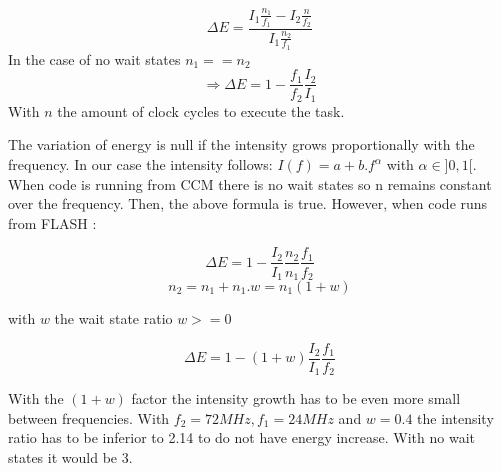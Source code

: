 \documentclass[conference]{IEEEtran}
\begin{document}
\[\Delta E = \frac{I_1 \frac{n_1}{f_1} - I_2 \frac{n}{f_2}}{I_1 \frac{n_2}{f_1}} \]
In the case of no wait states $n_1 == n_2$
\[\Rightarrow \Delta E = 1 - \frac{f_1}{f_2} \frac{I_2}{I_1}\]
With $n$ the amount of clock cycles to execute the task.

The variation of energy is null if the intensity grows proportionally with the
frequency. In our case the intensity follows: $I(f) = a + b.f^\alpha$ with
$\alpha \in ]0,1[$. When code is running from CCM there is no wait states so n
remains constant over the frequency. Then, the above formula is true. However,
when code runs from FLASH :

\[\Delta E = 1 - \frac{I_2}{I_1} \frac{n_2}{n_1} \frac{f_1}{f_2}\]
\[n_2 = n_1 + n_1.w = n_1(1+w) \] 
\begin{center}
    with $w$ the wait state ratio $w >= 0$   
\end{center}
\[\Delta E = 1 - (1+w)\frac{I_2}{I_1} \frac{f_1}{f_2}\]

With the $(1+w)$ factor the intensity growth has to be even more small between
frequencies. With $f_2 = 72 MHz, f_1 = 24 MHz$ and $w = 0.4$ the intensity ratio
has to be inferior to 2.14 to do not have energy increase. With no wait states it would be 3.




\end{document}
